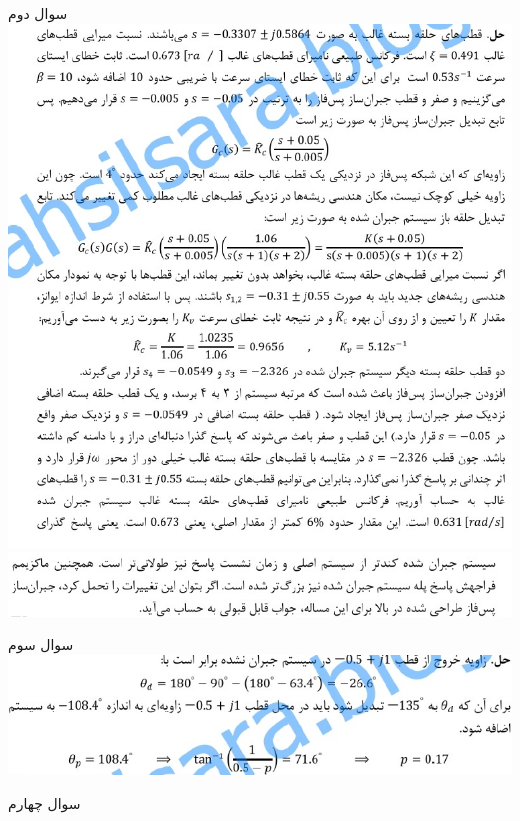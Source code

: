 \documentclass{article}
\begin{document}
    \begin{problem}{سوال دوم}
    	\includegraphics[width=\linewidth]{Resources/2.png}
    	\includegraphics[width=\linewidth]{Resources/2-2.png}
    	
    \end{problem}
    
    \begin{problem}{سوال سوم}
    	\includegraphics[width=\linewidth]{Resources/3.png}
    
    \end{problem}
    
    
    \begin{problem}{سوال چهارم}

    \end{problem}
\end{document}
